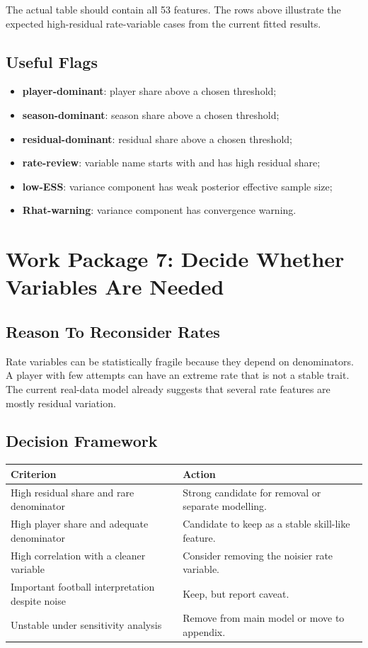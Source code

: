 \documentclass[11pt]{article}
\newcommand{\code}[1]{\texttt{\detokenize{#1}}}
\begin{document}
The actual table should contain all 53 features. The rows above illustrate the
expected high-residual rate-variable cases from the current fitted results.

\subsection{Useful Flags}

\begin{itemize}[leftmargin=*]
  \item \textbf{player-dominant}: player share above a chosen threshold;
  \item \textbf{season-dominant}: season share above a chosen threshold;
  \item \textbf{residual-dominant}: residual share above a chosen threshold;
  \item \textbf{rate-review}: variable name starts with \code{rate_*} and has
  high residual share;
  \item \textbf{low-ESS}: variance component has weak posterior effective
  sample size;
  \item \textbf{Rhat-warning}: variance component has convergence warning.
\end{itemize}

\section{Work Package 7: Decide Whether \code{rate_*} Variables Are Needed}

\subsection{Reason To Reconsider Rates}

Rate variables can be statistically fragile because they depend on
denominators. A player with few attempts can have an extreme rate that is not a
stable trait. The current real-data model already suggests that several rate
features are mostly residual variation.

\subsection{Decision Framework}

\begin{longtable}{L{0.30\textwidth}L{0.60\textwidth}}
\toprule
Criterion & Action \\
\midrule
\endhead
High residual share and rare denominator & Strong candidate for removal or
separate modelling. \\
High player share and adequate denominator & Candidate to keep as a stable
skill-like feature. \\
High correlation with a cleaner \code{per90_*} variable & Consider removing
the noisier rate variable. \\
Important football interpretation despite noise & Keep, but report caveat. \\
Unstable under sensitivity analysis & Remove from main model or move to
appendix. \\
\bottomrule
\end{longtable}
\end{document}
